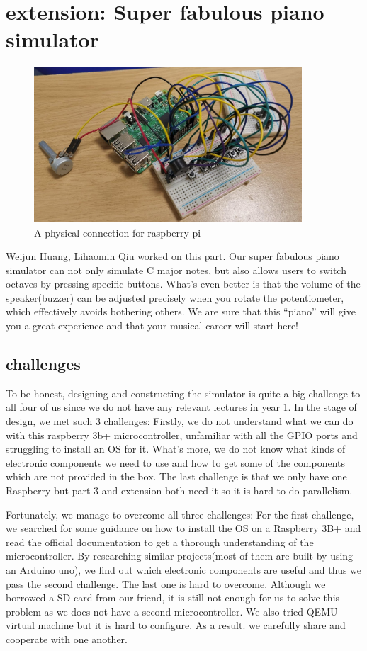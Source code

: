\documentclass[11pt]{article}
\begin{document}
\section{extension: Super fabulous piano simulator}

\begin{figure}[H]
	\centering
	\includegraphics[width=10cm]{src/extension.png}
	\caption{A physical connection for raspberry pi}
	\label{fig:extension}
\end{figure}

Weijun Huang, Lihaomin Qiu worked on this part. Our super fabulous piano simulator can not only simulate C major notes, but also allows users to switch octaves by pressing specific buttons. What’s even better is that the volume of the speaker(buzzer) can be adjusted precisely when you rotate the potentiometer, which effectively avoids bothering others.
We are sure that this “piano” will give you a great experience and that your musical career will start here!

\subsection{challenges}

To be honest, designing and constructing the simulator is quite a big challenge to all four of us since we do not have any relevant lectures in year 1. 
In the stage of design, we met such 3 challenges:
Firstly, we do not understand what we can do with this raspberry 3b+ microcontroller, unfamiliar with all the GPIO ports and struggling to install an OS for it. What’s more, we do not know what kinds of electronic components we need to use and how to get some of the components which are not provided in the box. The last challenge is that we only have one Raspberry but part 3 and extension both need it so it is hard to do parallelism.

Fortunately, we manage to overcome all three challenges:
For the first challenge, we searched for some guidance on how to install the OS on a Raspberry 3B+ and read the official documentation to get a thorough understanding of the microcontroller. By researching similar projects(most of them are built by using an Arduino uno), we find out which electronic components are useful and thus we pass the second challenge. The last one is hard to overcome. Although we borrowed a SD card from our friend, it is still not enough for us to solve this problem as we does not have a second microcontroller. We also tried QEMU virtual machine but it is hard to configure. As a result. we carefully share and cooperate with one another.
\end{document}

